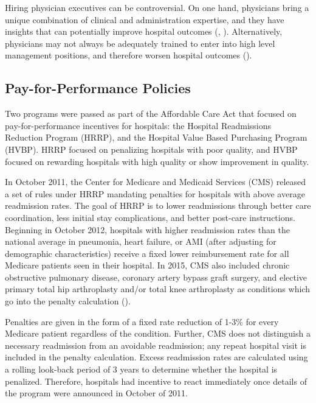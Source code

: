 \documentclass[12pt]{article}
\begin{document}
    Hiring physician executives can be controversial. On one hand, physicians bring a unique combination of clinical and administration expertise, and they have insights that can potentially improve hospital outcomes (\cite{Stajduhar_2023}, \cite{Ahmed_2022}). Alternatively, physicians may not always be adequately trained to enter into high level management positions, and therefore worsen hospital outcomes (\cite{HarvardBusinessReview2018}). 

  
    \subsection{Pay-for-Performance Policies}\label{sec:hrrp}

    Two programs were passed as part of the Affordable Care Act that focused on pay-for-performance incentives for hospitals: the Hospital Readmissions Reduction Program (HRRP), and the Hospital Value Based Purchasing Program (HVBP). HRRP focused on penalizing hospitals with poor quality, and HVBP focused on rewarding hospitals with high quality or show improvement in quality. 

    In October 2011, the Center for Medicare and Medicaid Services (CMS) released a set of rules under HRRP mandating penalties for hospitals with above average readmission rates. The goal of HRRP is to lower readmissions through better care coordination, less initial stay complications, and better post-care instructions. Beginning in October 2012, hospitals with higher readmission rates than the national average in pneumonia, heart failure, or AMI (after adjusting for demographic characteristics) receive a fixed lower reimbursement rate for all Medicare patients seen in their hospital. In 2015, CMS also included chronic obstructive pulmonary disease, coronary artery bypass graft surgery, and elective primary total hip arthroplasty and/or total knee arthroplasty as conditions which go into the penalty calculation (\cite{CMS}). 
    
    Penalties are given in the form of a fixed rate reduction of 1-3\% for every Medicare patient regardless of the condition. Further, CMS does not distinguish a necessary readmission from an avoidable readmission; any repeat hospital visit is included in the penalty calculation. Excess readmission rates are calculated using a rolling look-back period of 3 years to determine whether the hospital is penalized. Therefore, hospitals had incentive to react immediately once details of the program were announced in October of 2011. 
\end{document}
